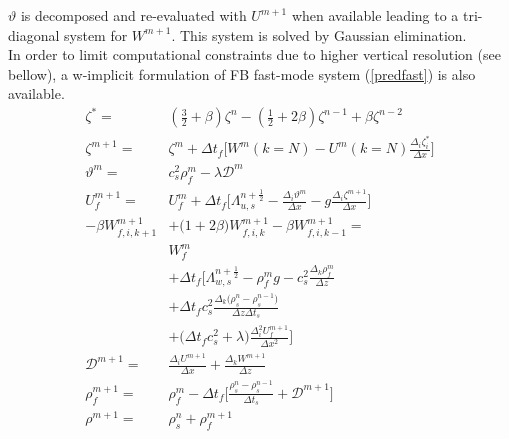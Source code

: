 \documentclass[a4paper,11pt]{article}
\begin{document}
 $\vartheta$ is decomposed and re-evaluated with $U^{m+1}$ when available leading to a tri-diagonal system for $W^{m+1}$. This system is solved by Gaussian elimination.\\ 
 In order to limit computational constraints due to higher vertical resolution (see bellow), a w-implicit formulation of FB fast-mode system (\ref{predfast}) is also available.
  \begin{equation}
  \label{predcorrwimp}
  \begin{split}
    \displaystyle
      \zeta^{*}=&(\frac{3}{2}+\beta)\zeta^{n}-(\frac{1}{2}+2\beta)\zeta^{n-1}
     +\beta\zeta^{n-2}\\[3mm]
     \zeta^{m+1}=&\zeta^{m}
     +\Delta{t}_{f}\big[W^{m}\scriptstyle(k=N)\textstyle
     -U^{m}\scriptstyle(k=N)\textstyle \frac{\Delta_i\zeta_{i}^{*}}{\Delta{x}}\big]\\[3mm]
     \vartheta^m =&c_s^2\rho_{f}^m-\lambda{\mathcal{D}}^m\\[3mm]
     U_{f}^{m+1}=&U_{f}^{m}
     +\Delta{t_{f}}\big[\Lambda_{u,s}^{n+\frac{1}{2}}
     -\frac{\Delta_i\vartheta^m}{\Delta x}
     -g\frac{\Delta_i\zeta^{m+1}}{\Delta x}\big]\\[3mm]
     -\beta W_{f,i,k+1}^{m+1}&
     +\big(1+2\beta\big)W_{f,i,k}^{m+1}
     -\beta W_{f,i,k-1}^{m+1} = \\[3mm]
     & W_{f}^m\\[3mm]
     & +\Delta t_f\big[\Lambda_{w,s}^{n+\frac{1}{2}}
     -\rho_{f}^m g-c_s^2\frac{\Delta_k\rho_{f}^m}{\Delta z}\\[3mm]
     &+\Delta t_f c_s^2\frac{\Delta_k
     \big(\rho_{s}^{n}-\rho_{s}^{n-1}\big)}{\Delta z\Delta{t_{s}}}\\[3mm]
     &+\big(\Delta t_f c_s^2+\lambda\big)
     \frac{\Delta_i^2 U_{f}^{m+1}}{\Delta x^2}
     \big]\\[3mm]
     \mathcal{D}^{m+1} =&\frac{\Delta_i U^{m+1}}{\Delta{x}}
     +\frac{\Delta_k W^{m+1}}{\Delta{z}}\\[3mm]
      \rho_{f}^{m+1} =& \rho_{f}^{m}
     -\Delta{t_{f}}\big[\frac{\rho_{s}^{n}-\rho_{s}^{n-1}}{\Delta{t_{s}}}
     +\mathcal{D}^{m+1}\big]\\[3mm]
     \rho^{m+1}=&\rho_{s}^{n}+\rho_{f}^{m+1}
  \end{split}
  \end{equation}
\end{document}
